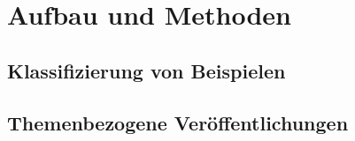 
\chapter{Aufbau und Methoden}
\label{cha:stand_der_technik}

\section{Klassifizierung von Beispielen}
\label{sec:klassifizierung}

\section{Themenbezogene Veröffentlichungen}
\label{sec:themenbezogene_veroeffentlichungen}